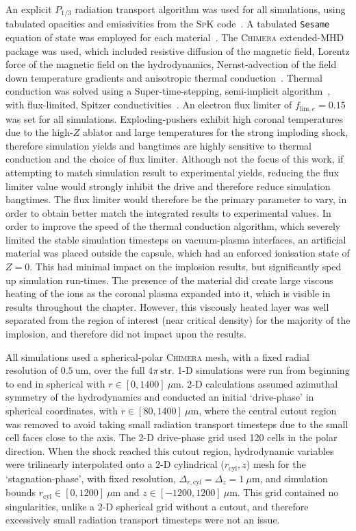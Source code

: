 An explicit $P_{1/3}$ radiation transport algorithm was used for all simulations, using tabulated opacities and emissivities from the \textsc{SpK} code~\cite{crilly_spk_2023}.
A tabulated \texttt{Sesame} equation of state was employed for each material~\cite{mchardy_introduction_2018}.
The \textsc{Chimera} extended-\ac{MHD} package was used, which included resistive diffusion of the magnetic field, Lorentz force of the magnetic field on the hydrodynamics, Nernst-advection of the field down temperature gradients and anisotropic thermal conduction~\cite{walsh_extendedmagnetohydrodynamics_2020}.
Thermal conduction was solved using a Super-time-stepping, semi-implicit algorithm~\cite{vaidya_scalable_2017}, with flux-limited, Spitzer conductivities~\cite{spitzer_transport_1953}.
An electron flux limiter of $f_{\text{lim},e} = 0.15$ was set for all simulations.
Exploding-pushers exhibit high coronal temperatures due to the high-$Z$ ablator and large temperatures for the strong imploding shock, therefore simulation yields and bangtimes are highly sensitive to thermal conduction and the choice of flux limiter.
Although not the focus of this work, if attempting to match simulation result to experimental yields, reducing the flux limiter value would strongly inhibit the drive and therefore reduce simulation bangtimes.
The flux limiter would therefore be the primary parameter to vary, in order to obtain better match the integrated results to experimental values.
In order to improve the speed of the thermal conduction algorithm, which severely limited the stable simulation timesteps on vacuum-plasma interfaces, an artificial material was placed outside the capsule, which had an enforced ionisation state of $Z=0$.
This had minimal impact on the implosion results, but significantly sped up simulation run-times.
The presence of the material did create large viscous heating of the ions as the coronal plasma expanded into it, which is visible in results throughout the chapter.
However, this viscously heated layer was well separated from the region of interest (near critical density) for the majority of the implosion, and therefore did not impact upon the results.

All simulations used a spherical-polar \textsc{Chimera} mesh, with a fixed radial resolution of $0.5\ \text{um}$, over the full $4\pi\ \text{str}$.
1-D simulations were run from beginning to end in spherical with $r\in[0,1400]\ \mu\text{m}$.
2-D calculations assumed azimuthal symmetry of the hydrodynamics and conducted an initial `drive-phase' in spherical coordinates, with $r\in[80,1400]\ \mu\text{m}$, where the central cutout region was removed to avoid taking small radiation transport timesteps due to the small cell faces close to the axis.
The 2-D drive-phase grid used 120 cells in the polar direction.
When the shock reached this cutout region, hydrodynamic variables were trilinearly interpolated onto a 2-D cylindrical ($r_{\text{cyl}},z$) mesh for the `stagnation-phase', with fixed resolution, $\Delta_{r,\text{cyl}}=\Delta_z=1\ \mu\text{m}$, and simulation bounds $r_{\text{cyl}}\in[0,1200]\ \mu\text{m}$ and $z\in[-1200,1200]\ \mu\text{m}$.
This grid contained no singularities, unlike a 2-D spherical grid without a cutout, and therefore excessively small radiation transport timesteps were not an issue.

